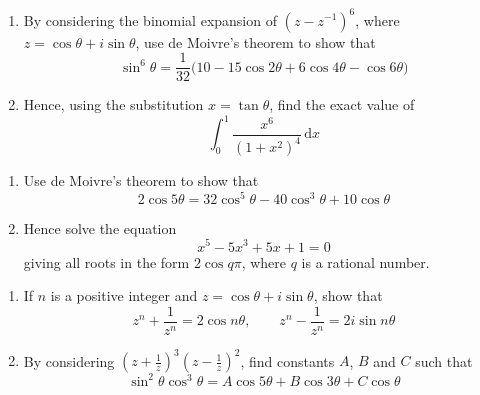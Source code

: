 \documentclass[leqno]{article}
\begin{document}
\begin{enumerate}[
  label=\textbf{\arabic*.},
  leftmargin=*,
  topsep=0pt,
  partopsep=0pt,
  parsep=0pt
]
\newpage


\questionitem

\begin{enumerate}[label=\textbf{(\alph*)}]
  \item By considering the binomial expansion of $(z-z^{-1})^6$, where $z=\cos\theta+i\sin\theta$, use de Moivre's theorem to show that
  \[
  \sin^6\theta=\frac{1}{32}\bigl(10-15\cos 2\theta+6\cos 4\theta-\cos 6\theta\bigr)
  \]
  \item Hence, using the substitution $x=\tan\theta$, find the exact value of
  \[
  \int_0^1 \frac{x^6}{(1+x^2)^4}\,\mathrm{d}x
  \]
\end{enumerate}

\newpage

\questionitem

\begin{enumerate}[label=\textbf{(\alph*)}]
  \item Use de Moivre's theorem to show that
  \[
  2\cos 5\theta = 32\cos^5\theta - 40\cos^3\theta + 10\cos\theta
  \]
  \item Hence solve the equation
  \[
  x^5 - 5x^3 + 5x + 1 = 0
  \]
  giving all roots in the form $2\cos q\pi$, where $q$ is a rational number.  \\
\end{enumerate}

\newpage


\questionitem

\begin{enumerate}[label=\textbf{(\alph*)}]
  \item If $n$ is a positive integer and $z = \cos\theta + i\sin\theta$, show that
  \[
  z^n + \frac{1}{z^n} = 2\cos n\theta,
  \qquad
  z^n - \frac{1}{z^n} = 2i\sin n\theta
  \]
  \item By considering $\left(z+\frac{1}{z}\right)^3\left(z-\frac{1}{z}\right)^2$, find constants $A$, $B$ and $C$ such that
  \[
  \sin^2\theta\cos^3\theta = A\cos 5\theta + B\cos 3\theta + C\cos\theta
  \]
\end{enumerate}

\newpage

\questionitem


\end{enumerate}
\end{document}
